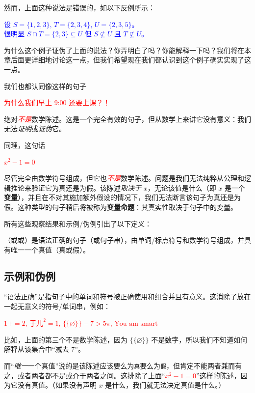然而，上面这种说法是错误的，如以下反例所示：
\begin{center}
    \textcolor{blue}{设 $S = \{1, 2, 3\}$, $T = \{2, 3, 4\}$, $U = \{2, 3, 5\}$。\\ 很明显 $S \cap T = \{2, 3\} \subseteq U$ 但 $S \nsubseteq U$ 且 $T \nsubseteq U$。}
\end{center}
为什么这个例子证伪了上面的说法？你弄明白了吗？你能解释一下吗？我们将在本章后面更详细地讨论这一点，但我们希望现在我们都认识到这个例子确实实现了这一点。

我们也都认同像这样的句子
\begin{center}
    \textcolor{red}{为什么我们早上 9:00 还要上课？！}
\end{center}
绝对\textcolor{red}{\emph{不是}}数学陈述。这是一个完全有效的句子，但从数学上来讲它没有意义：我们无法\emph{证明}或\emph{证伪}它。

同理，这句话
\begin{center}
    \textcolor{red}{$x^2 - 1 = 0$}
\end{center}
尽管完全由数学符号组成，但它也\textcolor{red}{\emph{不是}}数学陈述。问题是我们无法纯粹从公理和逻辑推论来验证它为真还是为假。该陈述\emph{取决于} $x$，无论该值是什么（即 $x$ 是一个\textbf{变量}），并且在不对其施加额外假设的情况下，我们无法断言该句子为真还是为假。这种类型的句子稍后将被称为\textbf{变量命题}：其真实性取决于句子中的变量。

所有这些观察结果和示例/伪例引出了以下定义：

\begin{definition}
    （或或）是语法正确的句子（或句子串），由单词/标点符号和数学符号组成，并具有唯一一个真值（真或假）。
\end{definition}

\subsection{示例和伪例}

``语法正确''是指句子中的单词和符号被正确使用和组合并且有意义。这消除了放在一起无意义的符号/单词串，例如：
\begin{center}
    \textcolor{red}{$1+ = 2$, $\text{于儿}^2 = 1$, $\{\{\varnothing\}\} - 7 > 5\pi$, $\text{You am smart}$}
\end{center}
比如，上面的第三个不是数学陈述，因为 $\{\{\varnothing\}\}$ 不是数字，所以我们不知道如何解释从该集合中``减去 $7$''。

而``\emph{唯一}一个真值''说的是该陈述应该要么为\verb|真|要么为\verb|假|，但肯定不能两者兼而有之，或者两者都不是或介于两者之间。这排除了上面``\textcolor{red}{$x^2 - 1 = 0$}''这样的陈述，因为它没有真值。（如果没有声明 $x$ 是什么，我们就无法决定真值是什么。）

